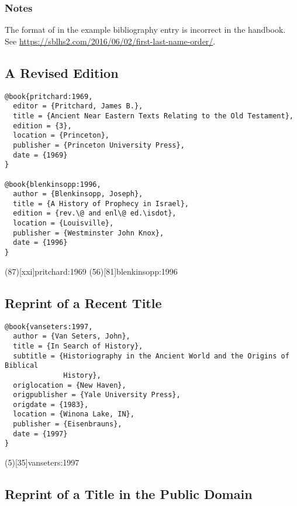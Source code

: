 \documentclass[a4paper]{article}
\begin{document}
\begin{verbcite}
  \nocite{gerhardsson:1961}
\end{verbcite}
\exampleabbreviations
\examplebibliography

\subsubsection{Notes}

The format of  in the example bibliography
entry is incorrect in the handbook. See
\url{https://sblhs2.com/2016/06/02/first-last-name-order/}.

\subsection{A Revised Edition}

\begin{verbatim}
@book{pritchard:1969,
  editor = {Pritchard, James B.},
  title = {Ancient Near Eastern Texts Relating to the Old Testament},
  edition = {3},
  location = {Princeton},
  publisher = {Princeton University Press},
  date = {1969}
}

@book{blenkinsopp:1996,
  author = {Blenkinsopp, Joseph},
  title = {A History of Prophecy in Israel},
  edition = {rev.\@ and enl\@ ed.\isdot},
  location = {Louisville},
  publisher = {Westminster John Knox},
  date = {1996}
}
\end{verbatim}

\examplecite(87)[xxi]{pritchard:1969}
\examplecite(56)[81]{blenkinsopp:1996}
\examplebibliography

\subsection{Reprint of a Recent Title}

\begin{verbatim}
@book{vanseters:1997,
  author = {Van Seters, John},
  title = {In Search of History},
  subtitle = {Historiography in the Ancient World and the Origins of Biblical
              History},
  origlocation = {New Haven},
  origpublisher = {Yale University Press},
  origdate = {1983},
  location = {Winona Lake, IN},
  publisher = {Eisenbrauns},
  date = {1997}
}
\end{verbatim}

\examplecite(5)[35]{vanseters:1997}
\examplebibliography

\subsection{Reprint of a Title in the Public Domain}
\end{document}
